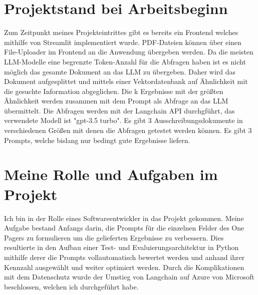 \section{Projektstand bei Arbeitsbeginn}
Zum Zeitpunkt meines Projekteintrittes gibt es bereits ein Frontend welches mithilfe von Streamlit implementiert wurde. 
PDF-Dateien können über einen File-Uploader im Frontend an die Anwendung übergeben werden. Da die meisten LLM-Modelle eine 
begrenzte Token-Anzahl für die Abfragen haben ist es nicht möglich das gesamte Dokument an das LLM zu übergeben. 
Daher wird das Dokument aufgesplittet und mittels einer Vektordatenbank auf Ähnlichkeit mit die gesuchte Information 
abgeglichen. Die k Ergebnisse mit der größten Ähnlichkeit werden zusammen mit dem Prompt als Abfrage an das LLM übermittelt. 
Die Abfragen werden mit der Langchain API durchgführt, das verwendete Modell ist "gpt-3.5 turbo". Es gibt 3 Ausschreibungsdokumente 
in verschiedenen Größen mit denen die Abfragen getestet werden können. Es gibt 3 Prompts, welche bislang nur bedingt gute 
Ergebnisse liefern.

\section{Meine Rolle und Aufgaben im Projekt}
Ich bin in der Rolle eines Softwareentwickler in das Projekt gekommen. Meine Aufgabe bestand Anfangs darin, die Prompts für die einzelnen 
Felder des One Pagers zu formulieren um die gelieferten Ergebnisse zu verbessern. Dies resultierte in den Aufbau einer 
Test- und Evaluierungsarchitektur in Python mithilfe derer die Prompts vollautomatisch bewertet werden und anhand ihrer Kennzahl 
ausgewählt und weiter optimiert werden. Durch die Komplikationen mit dem Datenschutz wurde der Umstieg von Langchain auf 
Azure von Microsoft beschlossen, welchen ich durchgeführt habe. 

